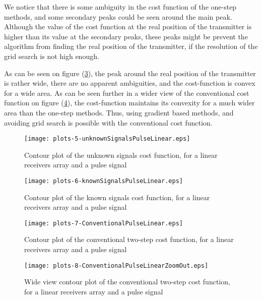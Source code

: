 We notice that there is some ambiguity in the cost function of the one-step methods, and some secondary peaks could be seen around the main peak. Although the value of the cost function at the real position of the transmitter is higher than its value at the secondary peaks, these peaks might be prevent the algorithm from finding the real position of the transmitter, if the resolution of the grid search is not high enough.

As can be seen on figure (\ref{fig:conventionalPulseLinear}), the peak around the real position of the transmitter is rather wide, there are no apparent ambiguities, and the cost-function is convex for a wide area. 
As can be seen further in a wider view of the conventional cost function on figure (\ref{fig:zoomoutConventionalPulseLinear}), the cost-function maintains its convexity for a much wider area than the one-step methods.
Thus, using gradient based methods, and avoiding grid search is possible with the conventional cost function.

\begin{figure}
\begin{center}
\texttt{[image: plots-5-unknownSignalsPulseLinear.eps]} 
\end{center}
\caption{Contour plot of the unknown signals cost function, for a linear receivers array and a pulse signal}
\label{fig:unknownSignalsPulseLinear}
\end{figure}

\begin{figure}
\begin{center}
\texttt{[image: plots-6-knownSignalsPulseLinear.eps]} 
\end{center}
\caption{Contour plot of the known signals cost function, for a linear receivers array and a pulse signal}
\label{fig:knownSignalsPulseLinear}
\end{figure}

\begin{figure}
\begin{center}
\texttt{[image: plots-7-ConventionalPulseLinear.eps]} 
\end{center}
\caption{Contour plot of the conventional two-step cost function, for a linear receivers array and a pulse signal}
\label{fig:conventionalPulseLinear}
\end{figure}

\begin{figure}
\begin{center}
\texttt{[image: plots-8-ConventionalPulseLinearZoomOut.eps]} 
\end{center}
\caption{Wide view contour plot of the conventional two-step cost function, for a linear receivers array and a pulse signal}
\label{fig:zoomoutConventionalPulseLinear}
\end{figure}

